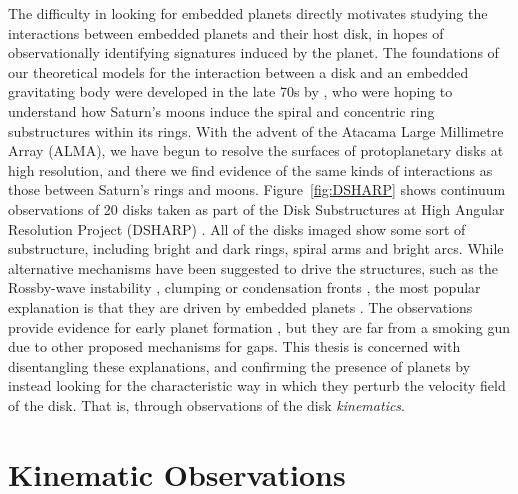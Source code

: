 The difficulty in looking for embedded planets directly motivates studying the interactions between embedded planets and their host disk, in hopes of observationally identifying signatures induced by the planet.
The foundations of our theoretical models for the interaction between a disk and an embedded gravitating body were developed in the late 70s by \citet{goldreich1978,goldreich1979,goldreich1980}, who were hoping to understand how Saturn's moons induce the spiral and concentric ring substructures within its rings.
With the advent of the Atacama Large Millimetre Array (ALMA), we have begun to resolve the surfaces of protoplanetary disks at high resolution, and there we find evidence of the same kinds of interactions as those between Saturn's rings and moons.
Figure~\ref{fig:DSHARP} shows continuum observations of 20 disks taken as part of the Disk Substructures at High Angular Resolution Project (DSHARP) \citep{andrews2018}.
All of the disks imaged show some sort of substructure, including bright and dark rings, spiral arms and bright arcs.
While alternative mechanisms have been suggested to drive the structures, such as the Rossby-wave instability \citep{pinilla2012}, clumping \citep{lyra2013} or condensation fronts \citep{zhang2015a}, the most popular explanation is that they are driven by embedded planets \citep{dipierro2015,dong2015b,bae2017,fedele2017,fedele2018,zhang2018}.
The observations provide evidence for early planet formation \citep[e.g. fully formed planets in HL Tau with age $<1$ Myr, see][]{dipierro2015}, but they are far from a smoking gun due to other proposed mechanisms for gaps.
This thesis is concerned with disentangling these explanations, and confirming the presence of planets by instead looking for the characteristic way in which they perturb the velocity field of the disk.
That is, through observations of the disk \textit{kinematics}.

\section{Kinematic Observations}

